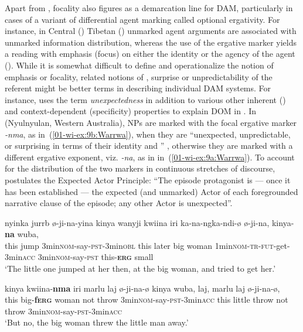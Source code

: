 \documentclass[output=paper]{LSP/langsci}
\begin{document}
Apart from , focality also figures as a demarcation line for DAM, particularly in cases of a variant of differential agent marking called optional ergativity.
 For instance, in Central () Tibetan () unmarked agent arguments are associated with unmarked information distribution, whereas the use of the ergative marker yields a reading with emphasis (focus) on either the identity or the agency of the agent (\cf \citealt{Tournadre1991Rhetorical}). 
While it is somewhat difficult to define and operationalize the notion of emphasis or focality, related notions of , surprise or unpredictability of the referent might be better terms in describing individual DAM systems.
For instance, \citet{Schikowski2013Object-conditioned} uses the term \textit{unexpectedness} in addition to various other inherent () and context-dependent (specificity) properties to explain DOM in . 
In  (Nyulnyulan, Western Australia), NPs are marked with the focal ergative marker \textit{-nma}, as in~(\ref{01-wi-ex:9b:Warrwa}), when they are “unexpected, unpredictable, or surprising in terms of their identity and ” \citep[399]{McGregor2006Focal}, otherwise they are marked with a different ergative exponent, viz. \textit{-na}, as in in~(\ref{01-wi-ex:9a:Warrwa}).
To account for the distribution of the two markers in continuous stretches of discourse, \citet[516]{McGregor1998Optional} postulates the Expected Actor Principle: “The episode protagonist is — once it has been established — the expected (and unmarked) Actor of each foregrounded narrative clause of the episode; any other Actor is unexpected”.

\ea\label{01-wi-ex:9:Warrwa}
\begin{xlist}
\ex\label{01-wi-ex:9a:Warrwa}
	\gll nyinka	jurrb	ø-ji-na-yina			kinya	wanyji	kwiina	iri ka-na-ngka-ndi-ø			ø-ji-na,		kinya-\textbf{na}	wuba,\\
		this		jump	3min\textsc{nom}-say-\textsc{pst}-3min\textsc{obl}	this	later	big	woman 1min\textsc{nom}-\textsc{tr}-\textsc{fut}-get-3min\textsc{acc}	3min\textsc{nom}-say-\textsc{pst}	this-\textsc{\textbf{erg}}	small\\
	\glt ‘The little one jumped at her then, at the big woman, and tried to get her.’
	
\ex\label{01-wi-ex:9b:Warrwa}
	\gll kinya	kwiina-\textbf{nma}	iri		marlu	laj	ø-ji-na-ø kinya	wuba,	laj, 	marlu	laj 	ø-ji-na-ø,\\
	this big-\textbf{f\textsc{erg}} woman	not throw 3min\textsc{nom}-say-\textsc{pst}-3min\textsc{acc} this	little 	throw 	not 	throw	3min\textsc{nom}-say-\textsc{pst}-3min\textsc{acc}\\
	\glt ‘But no, the big woman threw the little man away.’

\end{xlist}
\z
\end{document}
